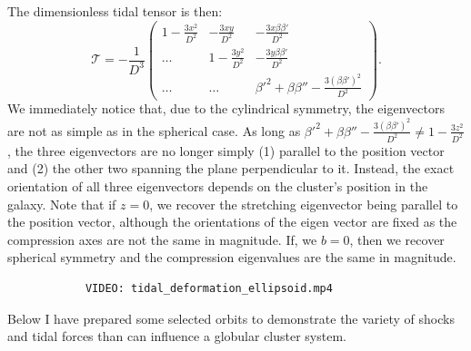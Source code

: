             The dimensionless tidal tensor is then: 
            \begin{equation}
                \mathcal{T}=-\frac{1}{D^3}\left(\begin{matrix}
                    1-\frac{3x^2}{D^2} & -\frac{3xy}{D^2} & -\frac{3x\beta \beta'}{D^2} \\
                    \dots & 1-\frac{3y^2}{D^2} & -\frac{3y\beta \beta'}{D^2} \\
                    \dots & \dots & \beta'^2 + \beta \beta'' -\frac{3\left(\beta\beta'\right)^2}{D^2}
                \end{matrix}\right).
            \end{equation}             
            We immediately notice that, due to the cylindrical symmetry, the eigenvectors are not as simple as in the spherical case. As long as $\beta'^2 + \beta \beta'' -\frac{3\left(\beta\beta'\right)^2}{D^2} \neq 1-\frac{3z^2}{D^2}$, the three eigenvectors are no longer simply (1) parallel to the position vector and (2) the other two spanning the plane perpendicular to it. Instead, the exact orientation of all three eigenvectors depends on the cluster's position in the galaxy. Note that if $z=0$, we recover the stretching eigenvector being parallel to the position vector, although the orientations of the eigen vector are fixed as the compression axes are not the same in magnitude. If, we $b=0$, then we recover spherical symmetry and the compression eigenvalues are the same in magnitude.

            \begin{verbatim}
            VIDEO: tidal_deformation_ellipsoid.mp4
            \end{verbatim}

            Below I have prepared some selected orbits to demonstrate the variety of shocks and tidal forces than can influence a globular cluster system. 
            
